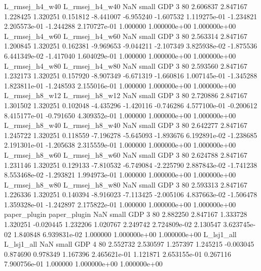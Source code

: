 L_rmsej_h4_w40 L_rmsej_h4_w40                   NaN      small      GDP                 3 80 2.606837       2.847167 1.228425       1.320251    0.151812     -8.441007     -6.955240    -1.607532   1.119275e-01 -1.234821 2.205573e-01    -1.244288   2.170727e-01            1.000000    1.000000e+00        1.000000e+00
L_rmsej_h4_w60 L_rmsej_h4_w60                   NaN      small      GDP                 3 80 2.563314       2.847167 1.200845       1.320251    0.162381     -9.969653     -9.044211    -2.107349   3.825938e-02 -1.875536 6.441349e-02    -1.417040   1.604029e-01            1.000000    1.000000e+00        1.000000e+00
L_rmsej_h4_w80 L_rmsej_h4_w80                   NaN      small      GDP                 3 80 2.593560       2.847167 1.232173       1.320251    0.157920     -8.907349     -6.671319    -1.660816   1.007145e-01 -1.345288 1.823811e-01    -1.248593   2.155016e-01            1.000000    1.000000e+00        1.000000e+00
L_rmsej_h8_w12 L_rmsej_h8_w12                   NaN      small      GDP                 3 80 2.720886       2.847167 1.301502       1.320251    0.102048     -4.435296     -1.420116    -0.746286   4.577100e-01 -0.200612 8.415177e-01    -0.791650   4.309352e-01            1.000000    1.000000e+00        1.000000e+00
L_rmsej_h8_w40 L_rmsej_h8_w40                   NaN      small      GDP                 3 80 2.642277       2.847167 1.245722       1.320251    0.118559     -7.196278     -5.645093    -1.893676   6.192891e-02 -1.238685 2.191301e-01    -1.205638   2.315559e-01            1.000000    1.000000e+00        1.000000e+00
L_rmsej_h8_w60 L_rmsej_h8_w60                   NaN      small      GDP                 3 80 2.624788       2.847167 1.231146       1.320251    0.129133     -7.810532     -6.749084    -2.225790   2.887843e-02 -1.741238 8.553468e-02    -1.293821   1.994973e-01            1.000000    1.000000e+00        1.000000e+00
L_rmsej_h8_w80 L_rmsej_h8_w80                   NaN      small      GDP                 3 80 2.593313       2.847167 1.226336       1.320251    0.140394     -8.916023     -7.113425    -2.005106   4.837663e-02 -1.506478 1.359328e-01    -1.242897   2.175822e-01            1.000000    1.000000e+00        1.000000e+00
  paper_plugin   paper_plugin                   NaN      small      GDP                 3 80 2.882250       2.847167 1.333728       1.320251   -0.020445      1.232206      1.020767     2.249742   2.724809e-02  2.130547 3.623745e-02     1.840848   6.939831e-02            1.000000    1.000000e+00        1.000000e+00
    L_lsj1_all     L_lsj1_all                   NaN      small      GDP                 4 80 2.552732       2.530597 1.257397       1.245215   -0.003045      0.874690      0.978349     1.167396   2.465621e-01  1.121871 2.653155e-01     0.267116   7.900756e-01            1.000000    1.000000e+00        1.000000e+00
